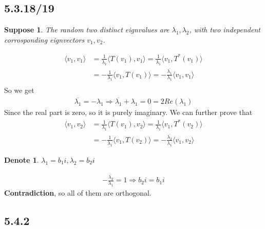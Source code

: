 \documentclass{article}
\newtheorem*{suppose}{Suppose}
\newtheorem*{denote}{Denote}
\begin{document}
\subsection*{5.3.18/19}
\begin{suppose}
    The random two distinct eignvalues are $\lambda_1, \lambda_2$, with two independent corrosponding eignvectors $v_1, v_2$.
\end{suppose}
\begin{equation*}
    \begin{split}
        \langle v_1 ,v_1 \rangle &= \frac{1}{\lambda_1} \langle T(v_1), v_1 \rangle = \frac{1}{\lambda_1} \langle v_1, T^*(v_1) \rangle\\
         &= -\frac{1}{\lambda_1} \langle v_1, T(v_1) \rangle = -\frac{\overline{\lambda_1}}{\lambda_1} \langle v_1, v_1 \rangle
         \\ 
    \end{split}
\end{equation*}
So we get
\begin{equation*}
    \begin{split}
        \overline{\lambda_1} = -\lambda_1 \Rightarrow  \overline{\lambda_1} + \lambda_1 = 0 = 2Re(\lambda_1)
    \end{split}
\end{equation*} 
Since the real part is zero, so it is purely imaginary. We can further prove that
\begin{equation*}
    \begin{split}
        \langle v_1 ,v_2 \rangle &= \frac{1}{\lambda_1} \langle T(v_1), v_2 \rangle = \frac{1}{\lambda_1} \langle v_1, T^*(v_2) \rangle\\
         &= -\frac{1}{\lambda_1} \langle v_1, T(v_2) \rangle = -\frac{\overline{\lambda_2}}{\lambda_1} \langle v_1, v_2 \rangle
    \end{split}
\end{equation*} 
\begin{denote}
    $\lambda_1 = b_1i, \lambda_2 = b_2 i$
\end{denote}
\begin{equation*}
    \begin{split}
        -\frac{\overline{\lambda_2}}{\lambda_1} = 1 \Rightarrow b_2i = b_1i
    \end{split}
\end{equation*}
\textbf{Contradiction}, so all of them are orthogonal.

\subsection*{5.4.2}
\end{document}
